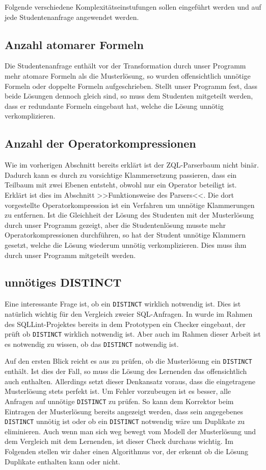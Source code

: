 Folgende verschiedene Komplexitätseinstufungen sollen eingeführt werden und auf jede Studentenanfrage angewendet werden.

\subsection{Anzahl atomarer Formeln}

Die Studentenanfrage enthält vor der Transformation durch unser Programm mehr atomare Formeln als die Musterlösung, so wurden offensichtlich unnötige Formeln oder doppelte Formeln aufgeschrieben. Stellt unser Programm fest, dass beide Lösungen dennoch gleich sind, so muss dem Studenten mitgeteilt werden, dass er redundante Formeln eingebaut hat, welche die Lösung unnötig verkomplizieren. 

\subsection{Anzahl der Operatorkompressionen}

Wie im vorherigen Abschnitt bereits erklärt ist der ZQL-Parserbaum nicht binär. Dadurch kann es durch zu vorsichtige Klammersetzung passieren, dass ein Teilbaum mit zwei Ebenen entsteht, obwohl nur ein Operator beteiligt ist. Erklärt ist dies im Abschnitt >>Funktionsweise des Parsers<<. Die dort vorgestellte Operatorkompression ist ein Verfahren um unnötige Klammerungen zu entfernen. Ist die Gleichheit der Lösung des Studenten mit der Musterlösung durch unser Programm gezeigt, aber die Studentenlösung musste mehr Operatorkompressionen durchführen, so hat der Student unnötige Klammern gesetzt, welche die Lösung wiederum unnötig verkomplizieren. Dies muss ihm durch unser Programm mitgeteilt werden.

\subsection{unnötiges DISTINCT}

Eine interessante Frage ist, ob ein \verb|DISTINCT| wirklich notwendig ist. Dies ist natürlich wichtig für den Vergleich zweier SQL-Anfragen. In \cite{brass2} wurde im Rahmen des SQLLint-Projektes bereits in dem Prototypen ein Checker eingebaut, der prüft ob \verb|DISTINCT| wirklich notwendig ist. Aber auch im Rahmen dieser Arbeit ist es notwendig zu wissen, ob das \verb|DISTINCT| notwendig ist. 

Auf den ersten Blick reicht es aus zu prüfen, ob die Musterlösung ein \verb|DISTINCT| enthält. Ist dies der Fall, so muss die Lösung des Lernenden das offensichtlich auch enthalten. Allerdings setzt dieser Denkansatz voraus, dass die eingetragene Musterlösung stets perfekt ist. Um Fehler vorzubeugen ist es besser, alle Anfragen auf unnötige \verb|DISTINCT| zu prüfen. So kann dem Korrektor beim Eintragen der Musterlösung bereits angezeigt werden, dass sein angegebenes \verb|DISTINCT| unnötig ist oder ob ein \verb|DISTINCT| notwendig wäre um Duplikate zu eliminieren. Auch wenn man sich weg bewegt vom Modell der Musterlösung und dem Vergleich mit dem Lernenden, ist dieser Check durchaus wichtig. Im Folgenden stellen wir daher einen Algorithmus vor, der erkennt ob die Lösung Duplikate enthalten kann oder nicht.

